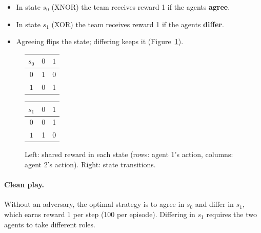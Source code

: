 \documentclass[11pt]{article}
\begin{document}
\begin{itemize}
  \item In state $s_0$ (XNOR) the team receives reward 1 if the agents \textbf{agree}.
  \item In state $s_1$ (XOR) the team receives reward 1 if the agents \textbf{differ}.
  \item Agreeing flips the state; differing keeps it (Figure~\ref{fig:toy}).
\end{itemize}

\begin{figure}[h]
  \centering
  \begin{minipage}{0.45\textwidth}
    \centering
    \begin{tabular}{c|cc}
      $s_0$ & $0$ & $1$ \\ \hline
      $0$ & 1 & 0 \\
      $1$ & 0 & 1
    \end{tabular}
    \hspace{1.5em}
    \begin{tabular}{c|cc}
      $s_1$ & $0$ & $1$ \\ \hline
      $0$ & 0 & 1 \\
      $1$ & 1 & 0
    \end{tabular}
  \end{minipage}
  \begin{minipage}{0.45\textwidth}
    \centering
  \end{minipage}
  \caption{Left: shared reward in each state (rows: agent 1's action, columns: agent 2's
  action). Right: state transitions.}
  \label{fig:toy}
\end{figure}

\paragraph{Clean play.} Without an adversary, the optimal strategy is to agree in $s_0$ and
differ in $s_1$, which earns reward 1 per step (100 per episode). Differing in $s_1$
requires the two agents to take different roles.
\end{document}
